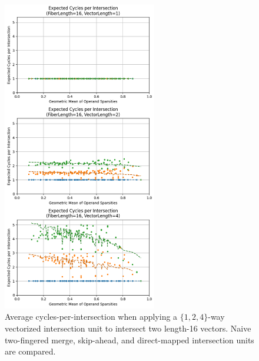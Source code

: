 \begin{figure}[H]
\centering
\includegraphics[width=0.6\textwidth]{figures/expected_cycles_F16.png}
\caption{Average cycles-per-intersection when applying a $\{1,2,4\}$-way vectorized intersection unit to intersect two length-16 vectors. Naive two-fingered merge, skip-ahead, and direct-mapped intersection units are compared.}
\label{fig:expected_cycles_F16}
\end{figure}

\newpage

